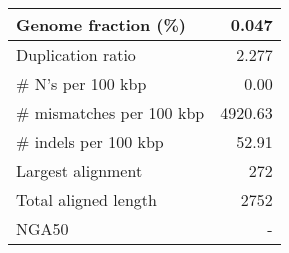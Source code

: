 \documentclass[12pt,a4paper]{article}
\begin{document}
\begin{table}[ht]
\begin{center}
\begin{tabular}{|l*{1}{|r}|}
Genome fraction (\%) & 0.047 \\ \hline
Duplication ratio & 2.277 \\ \hline
\# N's per 100 kbp & 0.00 \\ \hline
\# mismatches per 100 kbp & 4920.63 \\ \hline
\# indels per 100 kbp & 52.91 \\ \hline
Largest alignment & 272 \\ \hline
Total aligned length & 2752 \\ \hline
NGA50 & - \\ \hline
\end{tabular}
\end{center}
\end{table}
\end{document}
